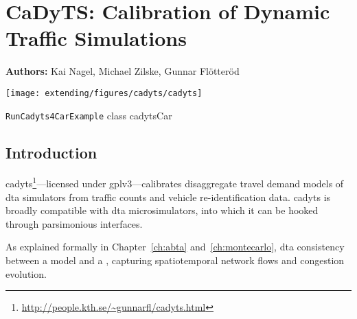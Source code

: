 \chapter{CaDyTS: Calibration of Dynamic Traffic Simulations}
\label{ch:cadyts}

\hfill \textbf{Authors:} Kai Nagel, Michael Zilske, Gunnar Fl\"otter\"od

\begin{center} \texttt{[image: extending/figures/cadyts/cadyts]} \end{center}


{\lstinline{RunCadyts4CarExample} class}
{cadytsCar}
{\citet[][]{cadyts-manual, floetteroed-2010e, FloetteroedChenEtAl2011BehavioralCalibAndAnaNETS, Floetteroed2008PhD, Moyo2013PhD}}



\section{Introduction}

\gls{cadyts}\footnote{\url{http://people.kth.se/~gunnarfl/cadyts.html}}---licensed under \gls{gplv3}---calibrates disaggregate travel demand models 
of \gls{dta} simulators from traffic counts and vehicle re-identification data. 
\gls{cadyts} is broadly compatible with \gls{dta} microsimulators,
into which it can be hooked through 
parsimonious interfaces.

As explained formally in Chapter~\ref{ch:abta} and~\ref{ch:montecarlo},
\gls{dta}  consistency between a  model and a
, capturing
spatiotemporal network flows and congestion evolution.

